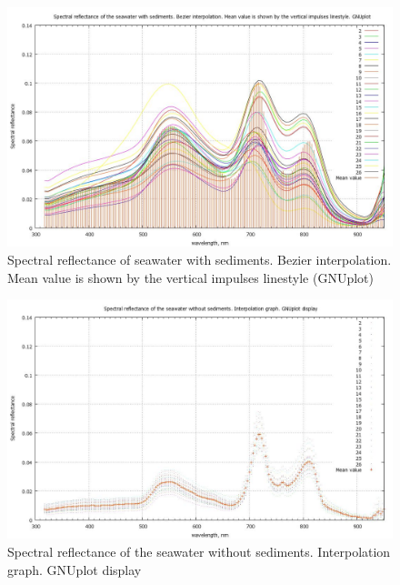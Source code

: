 \documentclass[10pt, a4paper]{article}
\begin{document}
\begin{appendices}
\begin{figure}[h]
\begin{center}
\includegraphics[scale=0.25]{GNU-09.jpg}
\caption{Spectral reflectance of seawater with sediments. Bezier interpolation. Mean value is shown by the vertical impulses linestyle (GNUplot)­}
\label{fig:52}
\end{center}
\end{figure}
\begin{figure}[h]
\begin{center}
\includegraphics[scale=0.25]{GNU-10.jpg}
\caption{Spectral reflectance of the seawater without sediments. Interpolation graph. GNUplot display­}
\label{fig:53}
\end{center}
\end{figure}
\pagebreak


\end{appendices}
\end{document}
